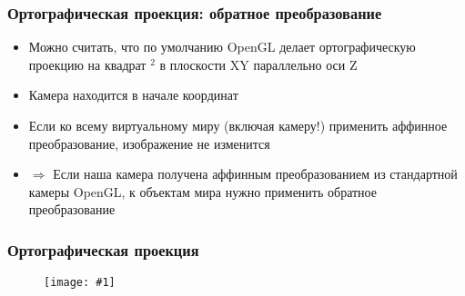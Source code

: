 \documentclass{beamer}
\newcommand{\slideimage}[1]{
  \begin{figure}
    \begin{adjustbox}{width=\textwidth, totalheight=\textheight-2\baselineskip-2\baselineskip,keepaspectratio}
      \texttt{[image: \#1]}
    \end{adjustbox}
  \end{figure}
}
\begin{document}
\begin{frame}[fragile]
\frametitle{Ортографическая проекция: обратное преобразование}
\begin{itemize}
\item Можно считать, что по умолчанию OpenGL делает ортографическую проекцию на квадрат \begin{math}[-1, 1]^2\end{math} в плоскости XY параллельно оси Z
\item Камера находится в начале координат
\pause
\item Если ко всему виртуальному миру (включая камеру!) применить аффинное преобразование, изображение не изменится
\pause
\item \begin{math}\Rightarrow\end{math} Если наша камера получена аффинным преобразованием из стандартной камеры OpenGL, к объектам мира нужно применить обратное преобразование
\end{itemize}
\end{frame}

\begin{frame}[fragile]
\frametitle{Ортографическая проекция}
\slideimage{orthographic.png}
\end{frame}
\end{document}
